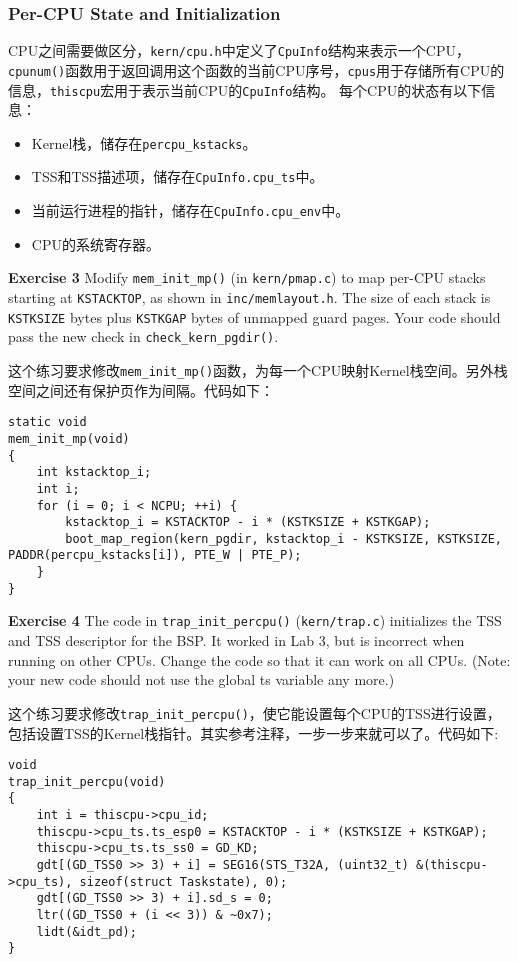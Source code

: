 \documentclass[11pt]{article}
\begin{document}
\subsubsection{Per-CPU State and Initialization}
CPU之间需要做区分，\lstinline|kern/cpu.h|中定义了\lstinline|CpuInfo|结构来表示一个CPU，\lstinline|cpunum()|函数用于返回调用这个函数的当前CPU序号，\lstinline|cpus|用于存储所有CPU的信息，\lstinline|thiscpu|宏用于表示当前CPU的\lstinline|CpuInfo|结构。
每个CPU的状态有以下信息：
\begin{itemize}
\item Kernel栈，储存在\lstinline|percpu_kstacks|。
\item TSS和TSS描述项，储存在\lstinline|CpuInfo.cpu_ts|中。
\item 当前运行进程的指针，储存在\lstinline|CpuInfo.cpu_env|中。
\item CPU的系统寄存器。
\end{itemize}

\begin{framed}
\noindent\textbf{Exercise 3} Modify \lstinline|mem_init_mp()| (in \lstinline|kern/pmap.c|) to map per-CPU stacks starting at \lstinline|KSTACKTOP|, as shown in \lstinline|inc/memlayout.h|. The size of each stack is \lstinline|KSTKSIZE| bytes plus \lstinline|KSTKGAP| bytes of unmapped guard pages. Your code should pass the new check in \lstinline|check_kern_pgdir()|.
\end{framed}

这个练习要求修改\lstinline|mem_init_mp()|函数，为每一个CPU映射Kernel栈空间。另外栈空间之间还有保护页作为间隔。代码如下：
\begin{lstlisting}[title=kern/pmap.c]
static void
mem_init_mp(void)
{
	int kstacktop_i;
	int i;
	for (i = 0; i < NCPU; ++i) { 
		kstacktop_i = KSTACKTOP - i * (KSTKSIZE + KSTKGAP); 
		boot_map_region(kern_pgdir, kstacktop_i - KSTKSIZE, KSTKSIZE, PADDR(percpu_kstacks[i]), PTE_W | PTE_P); 
	}
}
\end{lstlisting}

\begin{framed}
\noindent\textbf{Exercise 4} The code in \lstinline|trap_init_percpu()| (\lstinline|kern/trap.c|) initializes the TSS and TSS descriptor for the BSP. It worked in Lab 3, but is incorrect when running on other CPUs. Change the code so that it can work on all CPUs. (Note: your new code should not use the global ts variable any more.)
\end{framed}

这个练习要求修改\lstinline|trap_init_percpu()|，使它能设置每个CPU的TSS进行设置，包括设置TSS的Kernel栈指针。其实参考注释，一步一步来就可以了。代码如下:
\begin{lstlisting}[title=kern/trap.c]
void
trap_init_percpu(void)
{
	int i = thiscpu->cpu_id;
	thiscpu->cpu_ts.ts_esp0 = KSTACKTOP - i * (KSTKSIZE + KSTKGAP);
	thiscpu->cpu_ts.ts_ss0 = GD_KD;
	gdt[(GD_TSS0 >> 3) + i] = SEG16(STS_T32A, (uint32_t) &(thiscpu->cpu_ts), sizeof(struct Taskstate), 0);
	gdt[(GD_TSS0 >> 3) + i].sd_s = 0;
	ltr((GD_TSS0 + (i << 3)) & ~0x7);
	lidt(&idt_pd);
}
\end{lstlisting}
\end{document}
